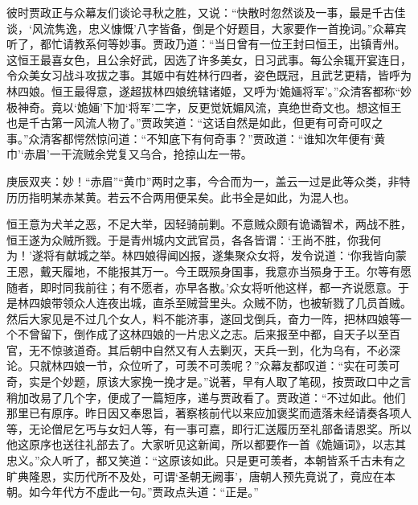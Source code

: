 \begin{parag}
    彼时贾政正与众幕友们谈论寻秋之胜，又说：“快散时忽然谈及一事，最是千古佳谈，‘风流隽逸，忠义慷慨’八字皆备，倒是个好题目，大家要作一首挽词。”众幕宾听了，都忙请教系何等妙事。贾政乃道：“当日曾有一位王封曰恒王，出镇青州。这恒王最喜女色，且公余好武，因选了许多美女，日习武事。每公余辄开宴连日，令众美女习战斗攻拔之事。其姬中有姓林行四者，姿色既冠，且武艺更精，皆呼为林四娘。恒王最得意，遂超拔林四娘统辖诸姬，又呼为‘姽婳将军’。”众清客都称“妙极神奇。竟以‘姽婳’下加‘将军’二字，反更觉妩媚风流，真绝世奇文也。想这恒王也是千古第一风流人物了。”贾政笑道：“这话自然是如此，但更有可奇可叹之事。”众清客都愕然惊问道：“不知底下有何奇事？”贾政道：“谁知次年便有‘黄巾’‘赤眉’一干流贼余党复又乌合，抢掠山左一带。\begin{note}庚辰双夹：妙！“赤眉”“黄巾”两时之事，今合而为一，盖云一过是此等众类，非特历历指明某赤某黄。若云不合两用便呆矣。此书全是如此，为混人也。\end{note}恒王意为犬羊之恶，不足大举，因轻骑前剿。不意贼众颇有诡谲智术，两战不胜，恒王遂为众贼所戮。于是青州城内文武官员，各各皆谓：‘王尚不胜，你我何为！’遂将有献城之举。林四娘得闻凶报，遂集聚众女将，发令说道：‘你我皆向蒙王恩，戴天履地，不能报其万一。今王既殒身国事，我意亦当殒身于王。尔等有愿随者，即时同我前往；有不愿者，亦早各散。’众女将听他这样，都一齐说愿意。于是林四娘带领众人连夜出城，直杀至贼营里头。众贼不防，也被斩戮了几员首贼。然后大家见是不过几个女人，料不能济事，遂回戈倒兵，奋力一阵，把林四娘等一个不曾留下，倒作成了这林四娘的一片忠义之志。后来报至中都，自天子以至百官，无不惊骇道奇。其后朝中自然又有人去剿灭，天兵一到，化为乌有，不必深论。只就林四娘一节，众位听了，可羡不可羡呢？”众幕友都叹道：“实在可羡可奇，实是个妙题，原该大家挽一挽才是。”说著，早有人取了笔砚，按贾政口中之言稍加改易了几个字，便成了一篇短序，递与贾政看了。贾政道：“不过如此。他们那里已有原序。昨日因又奉恩旨，著察核前代以来应加褒奖而遗落未经请奏各项人等，无论僧尼乞丐与女妇人等，有一事可嘉，即行汇送履历至礼部备请恩奖。所以他这原序也送往礼部去了。大家听见这新闻，所以都要作一首《姽婳词》，以志其忠义。”众人听了，都又笑道：“这原该如此。只是更可羡者，本朝皆系千古未有之旷典隆恩，实历代所不及处，可谓‘圣朝无阙事’，唐朝人预先竟说了，竟应在本朝。如今年代方不虚此一句。”贾政点头道：“正是。”
\end{parag}


